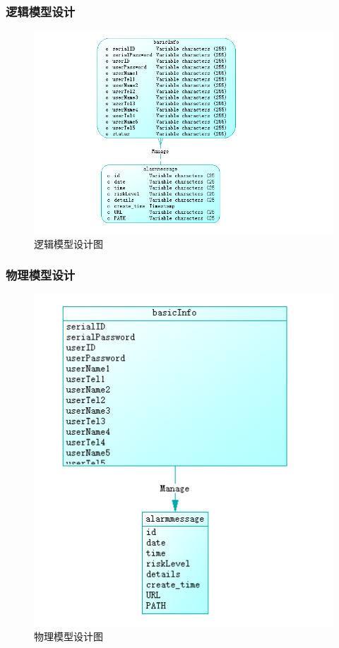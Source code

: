 \documentclass[article]{BJTU-thesis}
\begin{document}
\subsubsection{逻辑模型设计}
\begin{figure}[!htbp]
	\centering
	\includegraphics[scale=.9]{img/t11.png}
	\caption{逻辑模型设计图}
\end{figure}

\subsubsection{物理模型设计}
\begin{figure}[!htbp]
	\centering
	\includegraphics[scale=.9]{img/t12.png}
	\caption{物理模型设计图}
\end{figure}
\end{document}
